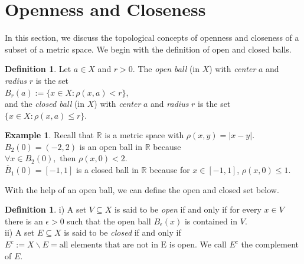 \documentclass[12pt, reqno]{amsart}
\theoremstyle{definition}
\newtheorem{definition}[theorem]{Definition}
\newtheorem{example}[theorem]{Example}
\numberwithin{equation}{section}
\newcommand{\dR}{{\mathbb R}}
\begin{document}
\section{Openness and Closeness}
In this section, we discuss the topological concepts of openness and closeness of a subset of a metric space. We begin with the definition of open and closed balls.
\begin{definition} \cite{s1}
    Let $a \in X$ and $r>0$. The \textit{open ball} (in $X$) with \textit{center} $a$ and \textit{radius} $r$ is the set\\
    \hspace*{4.5cm} $B_r(a) := \{x \in X: \rho(x,a) <r\}$,\\
    and the \textit{closed ball} (in $X$) with \textit{center} $a$ and \textit{radius} $r$ is the set\\
    \hspace*{4.5cm} $\{x \in X: \rho(x,a) \leq r\}$.
\end{definition}
\begin{example}
Recall that $\dR$ is a metric space with $\rho(x,y) = |x-y|$.\\
$B_2(0) = (-2,2)$ is an open ball in $\dR$ because $\forall x \in B_2(0), \text{ then } \rho(x,0) < 2$.\\
$\overline{B}_1(0)=[-1,1]$ is a closed ball in $\dR$ because for $x \in [-1,1] $, $\rho(x,0) \leq 1$.
\end{example}

With the help of an open ball, we can define the open and closed set below.
\begin{definition} \cite{s1}
    i) A set $V \subseteq X$ is said to be \textit{open} if and only if for every $x \in V$ there is an $\epsilon > 0$ such that the open ball $B_\epsilon(x)$ is contained in $V$.\\
    ii)  A set $E \subseteq X$ is said to be \textit{closed} if and only if $E^c := X\backslash E=\text{all elements that are not in E} $ is open. We call  $E^c$ the complement of $E.$ \label{open_close}
\end{definition}
\end{document}
